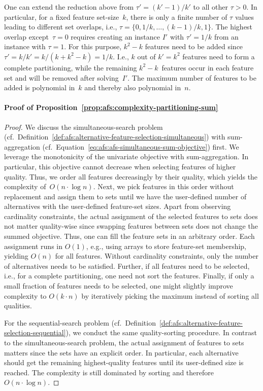\documentclass{article}
\theoremstyle{definition}
\begin{document}
One can extend the reduction above from $\tau' = (k' - 1) / k'$ to all other $\tau > 0$.
In particular, for a fixed feature set-size~$k$, there is only a finite number of $\tau$ values leading to different set overlaps, i.e., $\tau = \{0, 1/k, \dots, (k - 1) / k, 1\}$.
The highest overlap except~$\tau=0$ requires creating an instance $I'$ with $\tau'= 1/k$ from an instance with $\tau = 1$.
For this purpose, $k^2 - k$ features need to be added since $\tau' = k / k' = k / (k + k^2 -k) = 1/k$.
I.e., $k$ out of $k' = k^2$ features need to form a complete partitioning, while the remaining $k^2 - k$~features occur in each feature set and will be removed after solving~$I'$.
The maximum number of features to be added is polynomial in~$k$ and thereby also polynomial in~$n$.

\paragraph{Proof of Proposition~\ref{prop:afs:complexity-partitioning-sum}}
%
\begin{proof}
We discuss the simultaneous-search problem (cf.~Definition~\ref{def:afs:alternative-feature-selection-simultaneous}) with sum-aggregation (cf.~Equation~\ref{eq:afs:afs-simultaneous-sum-objective}) first.
We leverage the monotonicity of the univariate objective with sum-aggregation.
In particular, this objective cannot decrease when selecting features of higher quality.
Thus, we order all features decreasingly by their quality, which yields the complexity of~$O(n \cdot \log n)$.
Next, we pick features in this order without replacement and assign them to sets until we have the user-defined number of alternatives with the user-defined feature-set sizes.
Apart from observing cardinality constraints, the actual assignment of the selected features to sets does not matter quality-wise since swapping features between sets does not change the summed objective.
Thus, one can fill the feature sets in an arbitrary order.
Each assignment runs in $O(1)$, e.g., using arrays to store feature-set membership, yielding $O(n)$ for all features.
Without cardinality constraints, only the number of alternatives needs to be satisfied.
Further, if all features need to be selected, i.e., for a complete partitioning, one need not sort the features.
Finally, if only a small fraction of features needs to be selected, one might slightly improve complexity to $O(k \cdot n)$ by iteratively picking the maximum instead of sorting all qualities.

For the sequential-search problem (cf.~Definition~\ref{def:afs:alternative-feature-selection-sequential}), we conduct the same quality-sorting procedure.
In contrast to the simultaneous-search problem, the actual assignment of features to sets matters since the sets have an explicit order.
In particular, each alternative should get the remaining highest-quality features until its user-defined size is reached.
The complexity is still dominated by sorting and therefore~$O(n \cdot \log n)$.
\end{proof}
\end{document}
